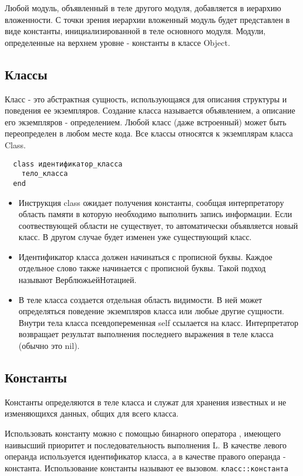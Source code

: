 Любой модуль, объявленный в теле другого модуля, добавляется в иерархию вложенности. С точки зрения иерархии вложенный модуль будет представлен в виде константы, инициализированной в теле основного модуля. Модули, определенные на верхнем уровне - константы в классе Object.

\subsection{Классы}

Класс - это абстрактная сущность, использующаяся для описания структуры и поведения ее экземпляров. Создание класса называется объявлением, а описание его экземпляров - определением. Любой класс (даже встроенный) может быть переопределен в любом месте кода. Все классы относятся к экземплярам класса Class.

\begin{verbatim}
  class идентификатор_класса
    тело_класса
  end
\end{verbatim}

\begin{itemize}
  \item Инструкция class ожидает получения константы, сообщая интерпретатору область памяти в которую необходимо выполнить запись информации. Если соотвествующей области не существует, то автоматически объявляется новый класс. В другом случае будет изменен уже существующий класс.

  \item Идентификатор класса должен начинаться с прописной буквы. Каждое отдельное слово также начинается с прописной буквы. Такой подход называют ВерблюжьейНотацией.

  \item В теле класса создается отдельная область видимости. В ней может определяться поведение экземпляров класса или любые другие сущности. Внутри тела класса псевдопеременная self ссылается на класс. Интерпретатор возвращает результат выполнения последнего выражения в теле класса (обычно это nil).
\end{itemize}

\subsection{Константы}

Константы определяются в теле класса и служат для хранения известных и не изменяющихся данных, общих для всего класса. 

Использовать константу можно с помощью бинарного оператора \mono{::}, имеющего наивысший приоритет и последовательность выполнения L. В качестве левого операнда используется идентификатор класса, а в качестве правого операнда - константа. Использование константы называют ее вызовом.
\verb!класс::константа!

